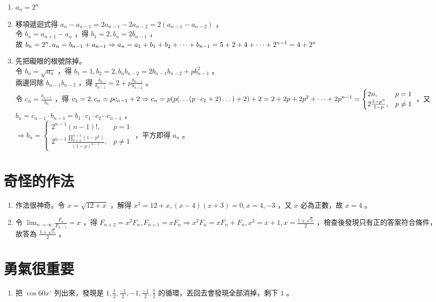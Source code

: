 \documentclass[12pt]{article}
\begin{document}
\begin{enumerate}
	\item $a_n = 2^n$
	\item 移項遞迴式得 $a_n - a_{n-1} = 2a_{n-1} - 2a_{n-2} = 2(a_{n-1} - a_{n-2})$ ，\\
		令 $b_n = a_{n+1} - a_n$ ，得 $b_1 = 2, b_n = 2b_{n-1}$ ，\\
		故 $b_n = 2^n, a_n = b_{n-1} + a_{n-1}\\ \Rightarrow a_n = a_1 + b_1 + b_2 + \cdots + b_{n-1} = 5 + 2 + 4 + \cdots + 2 ^ {n-1} = 4 + 2^n$
	\item 先把礙眼的根號除掉。\\
		令 $b_n = \sqrt{a_n}$ ，得 $b_1 = 1, b_2 = 2, b_n b_{n-2} = 2 b_{n-1} b_{n-2} + p b_{n-1} ^ 2$ 。\\
		兩邊同除 $b_{n-1} b_{n-2}$ ，得 $\frac{b_n}{b_{n-1}} = 2 + p \frac{b_{n-1}}{b_{n-2}}$ 。\\
		令 $c_n = \frac{b_{n+1}}{b_n}$ ，得 $c_1 = 2, c_n = pc_{n-1} + 2 \Rightarrow c_n = p(p(\dots(p \cdot c_1 + 2) \dots)+2)+2\\
		= 2 + 2p + 2p^2 + \dots + 2p^{n-1}
		= \begin{cases}
			2n, & p = 1\\
			2\frac{1-p^n}{1-p}, & p \ne 1
		\end{cases}$ ，又 $b_n = c_{n-1} \cdot b_{n-1} = b_1 \cdot c_1 \cdot c_2 \cdots c_{n-1}$ ，\\
		$\Rightarrow b_n = \begin{cases}
			2^{n-1} (n-1)!, & p = 1\\
			2^{n-1} \frac{\prod _ {k = 1} ^ {n - 1} (1 - p^k)}{(1-p)^{n-1}}, & p \ne 1
		\end{cases}$ ，平方即得 $a_n$ 。
\end{enumerate}

\section{奇怪的作法}

\begin{enumerate}
	\item 作法很神奇。令 $x = \sqrt{12 + x}$ ，解得 $x^2 = 12 + x, (x - 4)(x+3) = 0, x = 4, -3$ ，又 $x$ 必為正數，故 $x = 4$ 。
	\item 令 $\lim _ {n \rightarrow \infty} \frac{F_n}{F_{n-1}} = x$ ，得 $F_{n+2} = x^2F_n, F_{n+1} = xF_n \Rightarrow x^2F_n = xF_n + F_n, x^2 = x + 1, x = \frac{1 \pm \sqrt 5}{2}$ ，檢查後發現只有正的答案符合條件，故答為 $\frac{1 + \sqrt 5}{2}$ 。
\end{enumerate}

\section{勇氣很重要}

\begin{enumerate}
	\item 把 $\cos 60x^\circ$ 列出來，發現是 $1, \frac{1}{2}, \frac{-1}{2}, -1, \frac{-1}{2}, \frac{1}{2}$ 的循環，丟回去會發現全部消掉，剩下 $1$ 。
\end{enumerate}
\end{document}
